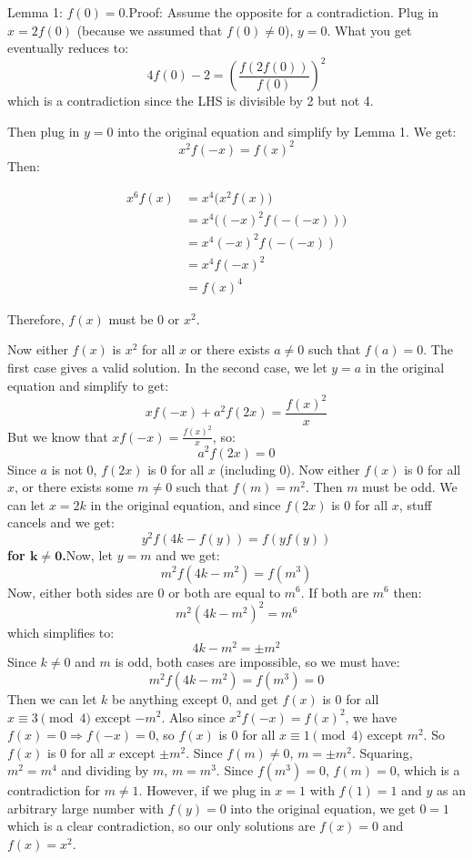 \begin{enumerate}
 Lemma 1: $f(0) = 0$.Proof: Assume the opposite for a contradiction. Plug in $x = 2f(0)$ (because we assumed that $f(0) \neq 0$), $y = 0$. What you get eventually reduces to:
 \[4f(0)-2 = \left( \frac{f(2f(0))}{f(0)} \right)^2\]which is a contradiction since the LHS is divisible by 2 but not 4.

 Then plug in $y = 0$ into the original equation and simplify by Lemma 1. We get:
 \[x^2f(-x) = f(x)^2\]Then:

 
 \begin{align*} x^6f(x) &= x^4\bigl(x^2f(x)\bigr)\\ &= x^4\bigl((-x)^2f(-(-x))\bigr)\\ &= x^4(-x)^2f(-(-x))\\ &= x^4f(-x)^2\\ &= f(x)^4 \end{align*}


 Therefore, $f(x)$ must be 0 or $x^2$.

 Now either $f(x)$ is $x^2$ for all $x$ or there exists $a \neq 0$ such that $f(a)=0$. The first case gives a valid solution. In the second case, we let $y = a$ in the original equation and simplify to get:
 \[xf(-x) + a^2f(2x) = \frac{f(x)^2}{x}\]But we know that $xf(-x) = \frac{f(x)^2}{x}$, so:
 \[a^2f(2x) = 0\]Since $a$ is not 0, $f(2x)$ is 0 for all $x$ (including 0). Now either $f(x)$ is 0 for all $x$, or there exists some $m \neq 0$ such that $f(m) = m^2$. Then $m$ must be odd. We can let $x = 2k$ in the original equation, and since $f(2x)$ is 0 for all $x$, stuff cancels and we get:
 \[y^2f(4k - f(y)) = f(yf(y))\]\textbf{for $\mathbf{k \neq 0}$.}Now, let $y = m$ and we get:
 \[m^2f(4k - m^2) = f(m^3)\]Now, either both sides are 0 or both are equal to $m^6$. If both are $m^6$ then:
 \[m^2(4k - m^2)^2 = m^6\]which simplifies to:
 \[4k - m^2 = \pm m^2\]Since $k \neq 0$ and $m$ is odd, both cases are impossible, so we must have:
 \[m^2f(4k - m^2) = f(m^3) = 0\]Then we can let $k$ be anything except 0, and get $f(x)$ is 0 for all $x \equiv 3 \pmod{4}$ except $-m^2$.  Also since $x^2f(-x) = f(x)^2$, we have $f(x) = 0 \Rightarrow f(-x) = 0$, so $f(x)$ is 0 for all $x \equiv 1 \pmod{4}$ except $m^2$. So $f(x)$ is 0 for all $x$ except $\pm m^2$. Since $f(m) \neq 0$, $m = \pm m^2$. Squaring, $m^2 = m^4$ and dividing by $m$, $m = m^3$. Since $f(m^3) = 0$, $f(m) = 0$, which is a contradiction for $m \neq 1$. However, if we plug in $x = 1$ with $f(1) = 1$ and $y$ as an arbitrary large number with $f(y) = 0$ into the original equation, we get $0 = 1$ which is a clear contradiction, so our only solutions are $f(x) = 0$ and $f(x) = x^2$.


\end{enumerate}
